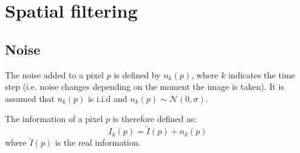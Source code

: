 \chapter{Spatial filtering}


\section{Noise}

The noise added to a pixel $p$ is defined by $n_k(p)$, 
where $k$ indicates the time step (i.e. noise changes depending on the moment the image is taken).
It is assumed that $n_k(p)$ is i.i.d and $n_k(p) \sim \mathcal{N}(0, \sigma)$.

The information of a pixel $p$ is therefore defined as:
\[ I_k(p) = \tilde{I}(p) + n_k(p) \]
where $\tilde{I}(p)$ is the real information.

